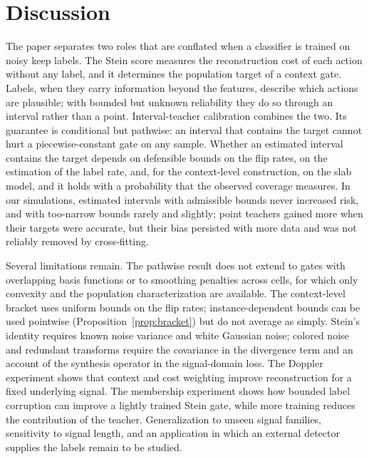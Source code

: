 \documentclass[11pt]{article}
\theoremstyle{plain}
\theoremstyle{definition}
\theoremstyle{remark}
\begin{document}
\section{Discussion}\label{sec:discussion}

The paper separates two roles that are conflated when a classifier is trained on noisy keep
labels. The Stein score measures the reconstruction cost of each action without any label,
and it determines the population target of a context gate. Labels, when they carry
information beyond the features, describe which actions are plausible; with bounded but
unknown reliability they do so through an interval rather than a point. Interval-teacher
calibration combines the two. Its guarantee is conditional but pathwise: an interval that
contains the target cannot hurt a piecewise-constant gate on any sample. Whether an estimated
interval contains the target depends on defensible bounds on the flip rates, on the estimation
of the label rate, and, for the context-level construction, on the slab model, and it holds with a
probability that the observed coverage measures. In our simulations, estimated intervals with
admissible bounds never increased risk, and with too-narrow bounds rarely and slightly; point
teachers gained more when their targets were accurate, but their bias persisted with more data
and was not reliably removed by cross-fitting.

Several limitations remain. The pathwise result does not extend to gates with overlapping
basis functions or to smoothing penalties across cells, for which only convexity and the
population characterization are available. The context-level bracket uses uniform bounds on
the flip rates; instance-dependent bounds can be used pointwise
(Proposition~\ref{prop:bracket}) but do not average as simply. Stein's identity requires known
noise variance and white Gaussian noise; colored noise and redundant transforms require the
covariance in the divergence term and an account of the synthesis operator in the signal-domain
loss. The Doppler experiment shows that context and cost weighting improve reconstruction
for a fixed underlying signal. The membership experiment shows how bounded label
corruption can improve a lightly trained Stein gate, while more training reduces
the contribution of the teacher. Generalization to unseen signal families, sensitivity to
signal length, and an application in which an external detector supplies the labels remain
to be studied.
\end{document}
